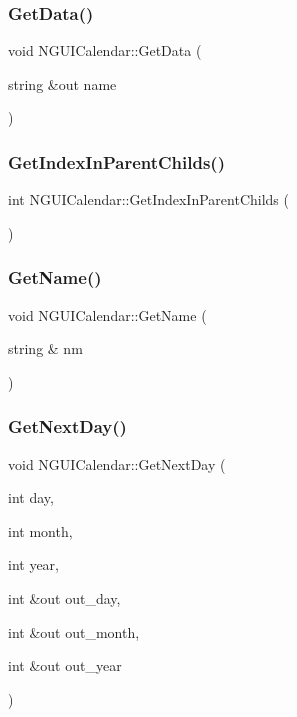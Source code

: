 \subsubsection{\texorpdfstring{Get\+Data()}{GetData()}}
{\footnotesize\ttfamily void N\+G\+U\+I\+Calendar\+::\+Get\+Data (\begin{DoxyParamCaption}\item[{string \&out}]{name }\end{DoxyParamCaption})}

\hypertarget{class_n_g_u_i_calendar_a8e19cf910502f551d7b129e80756040b}{}\label{class_n_g_u_i_calendar_a8e19cf910502f551d7b129e80756040b} 
\subsubsection{\texorpdfstring{Get\+Index\+In\+Parent\+Childs()}{GetIndexInParentChilds()}}
{\footnotesize\ttfamily int N\+G\+U\+I\+Calendar\+::\+Get\+Index\+In\+Parent\+Childs (\begin{DoxyParamCaption}{ }\end{DoxyParamCaption})}

\hypertarget{class_n_g_u_i_calendar_af7c4b281b93c9a8f68befd9f1a0530e8}{}\label{class_n_g_u_i_calendar_af7c4b281b93c9a8f68befd9f1a0530e8} 
\subsubsection{\texorpdfstring{Get\+Name()}{GetName()}}
{\footnotesize\ttfamily void N\+G\+U\+I\+Calendar\+::\+Get\+Name (\begin{DoxyParamCaption}\item[{string \&}]{nm }\end{DoxyParamCaption})}

\hypertarget{class_n_g_u_i_calendar_ae8fcfb2d16f84fd474957fe8f581ef9d}{}\label{class_n_g_u_i_calendar_ae8fcfb2d16f84fd474957fe8f581ef9d} 
\subsubsection{\texorpdfstring{Get\+Next\+Day()}{GetNextDay()}}
{\footnotesize\ttfamily void N\+G\+U\+I\+Calendar\+::\+Get\+Next\+Day (\begin{DoxyParamCaption}\item[{int}]{day,  }\item[{int}]{month,  }\item[{int}]{year,  }\item[{int \&out}]{out\+\_\+day,  }\item[{int \&out}]{out\+\_\+month,  }\item[{int \&out}]{out\+\_\+year }\end{DoxyParamCaption})}

